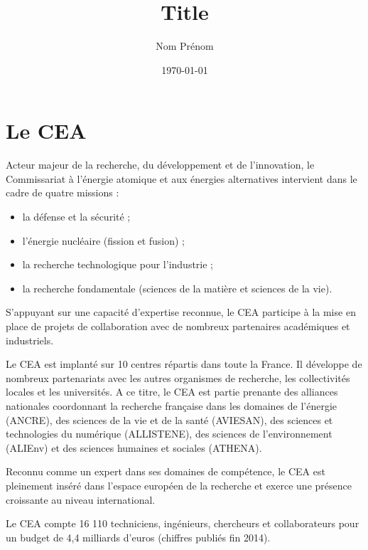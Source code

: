 \documentclass[12pt,a4paper,twoside]{article}
\title{Title}
\author{Nom Prénom}
\date{\today}
\begin{document}
\lstset{numbers=left, tabsize=3, frame=single, numberstyle=\ttfamily,
		basicstyle=\footnotesize} 
\thispagestyle{empty}

\section{Le CEA}
Acteur majeur de la recherche, du développement et de l'innovation, le
Commissariat à l'énergie atomique et aux énergies alternatives intervient dans
le cadre de quatre missions :

\begin{itemize}[label=\textbullet]
	\item	la défense et la sécurité ;
	\item	l'énergie nucléaire (fission et fusion) ;
	\item	la recherche technologique pour l'industrie ;
	\item	la recherche fondamentale (sciences de la matière et sciences
		de la vie).
\end{itemize}

S'appuyant sur une capacité d'expertise reconnue, le CEA participe à la mise en
place de projets de collaboration avec de nombreux partenaires académiques et
industriels.

Le CEA est implanté sur 10 centres répartis dans toute la France. Il développe
de nombreux partenariats avec les autres organismes de recherche, les
collectivités locales et les universités. A ce titre, le CEA est partie prenante
des alliances nationales coordonnant la recherche française dans les domaines de
l'énergie (ANCRE), des sciences de la vie et de la santé (AVIESAN), des sciences
et technologies du numérique (ALLISTENE), des sciences de l'environnement
(ALIEnv) et des sciences humaines et sociales (ATHENA).

Reconnu comme un expert dans ses domaines de compétence, le CEA est pleinement
inséré dans l'espace européen de la recherche et exerce une présence croissante
au niveau international.

Le CEA compte 16 110 techniciens, ingénieurs, chercheurs et collaborateurs pour
un budget de 4,4 milliards d'euros (chiffres publiés fin 2014).

\begin{figure}[b]
	\centering
\end{figure}
\end{document}
